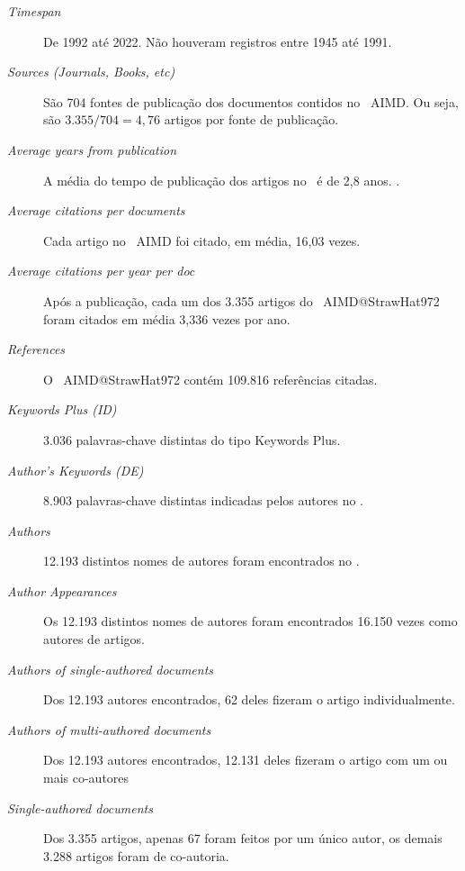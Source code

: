 \begin{description}
    \item [\textit{Timespan}] De 1992 até 2022. Não houveram registros entre 1945 até 1991.
    
    \item [\textit{Sources (Journals, Books, etc)}] São 704 fontes de publicação dos documentos contidos no \dataset\ AIMD. Ou seja, são $3.355/704=4,76$ artigos por fonte de publicação.
    
    \item [\textit{Average years from publication}]A média do tempo de publicação dos artigos no \dataset\ é de 2,8 anos.
    .    \item [\textit{Average citations per documents}] Cada artigo no \dataset\ AIMD foi citado, em média, 16,03 vezes.
    
    \item [\textit{Average citations per year per doc}] Após a publicação, cada um dos 3.355 artigos do \dataset\ AIMD@StrawHat972 foram citados em média 3,336 vezes por ano.
    
    \item [\textit{References}] O \dataset\ AIMD@StrawHat972 contém 109.816 referências citadas.
    
    \item [\textit{Keywords Plus (ID)}] 3.036 palavras-chave distintas do tipo Keywords Plus.
    
    \item [\textit{Author's Keywords (DE)}] 8.903 palavras-chave distintas indicadas pelos autores no \dataset.
    
    \item [\textit{Authors}] 12.193 distintos nomes de autores foram encontrados no \dataset.
    
    \item [\textit{Author Appearances}] Os 12.193 distintos nomes de autores foram encontrados 16.150 vezes como autores de artigos.
    
    \item [\textit{Authors of single-authored documents}] Dos 12.193 autores encontrados, 62 deles fizeram o artigo individualmente. 
    
    \item [\textit{Authors of multi-authored documents}] Dos 12.193 autores encontrados, 12.131 deles fizeram o artigo com um ou mais co-autores
    
    \item [\textit{Single-authored documents}] Dos 3.355 artigos, apenas 67 foram feitos por um único autor, os demais 3.288 artigos foram de co-autoria.
    

\end{description}
